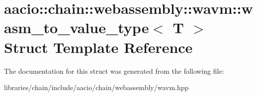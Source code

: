 \hypertarget{structaacio_1_1chain_1_1webassembly_1_1wavm_1_1wasm__to__value__type}{}\section{aacio\+:\+:chain\+:\+:webassembly\+:\+:wavm\+:\+:wasm\+\_\+to\+\_\+value\+\_\+type$<$ T $>$ Struct Template Reference}
\label{structaacio_1_1chain_1_1webassembly_1_1wavm_1_1wasm__to__value__type}


The documentation for this struct was generated from the following file\+:\begin{DoxyCompactItemize}
\item 
libraries/chain/include/aacio/chain/webassembly/wavm.\+hpp\end{DoxyCompactItemize}
